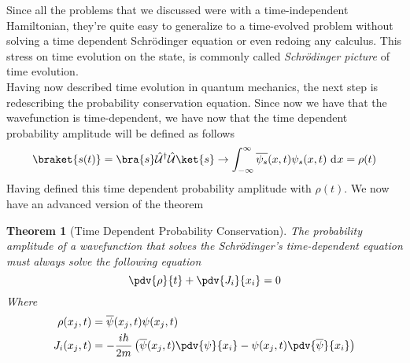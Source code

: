 \documentclass[a4paper, 11pt]{book}
\newcommand{\1}{\opr{\mathds{1}}}
\newcommand{\diff}[2][]{\ \mathrm{d}^{#1}#2}
\newcommand{\opr}[1]{\hat{#1}}
\newcommand{\adj}[2][]{#2^{\dagger#1}}
\newcommand{\U}{\opr{\mathcal{U}}}
\newtheorem{thm}{Theorem}
\theoremstyle{plain}
\begin{document}
	Since all the problems that we discussed were with a time-independent Hamiltonian, they're quite easy to generalize to a time-evolved problem without solving a time dependent Schrödinger equation or even redoing any calculus.
	This stress on time evolution on the state, is commonly called \textit{Schrödinger picture} of time evolution.\\
	Having now described time evolution in quantum mechanics, the next step is redescribing the probability conservation equation. Since now we have that the wavefunction is time-dependent, we have now that the time dependent probability amplitude will be defined as follows
	\begin{equation*}
		\braket{s(t)}=\bra{s}\adj{\U}\U\ket{s}\to\int_{-\infty}^{\infty}\overline{\psi_s}(x,t)\psi_s(x,t)\diff{x}=\rho(t)
	\end{equation*}
	Having defined this time dependent probability amplitude with $\rho(t)$. We now have an advanced version of the theorem %
	\begin{thm}[Time Dependent Probability Conservation]
		The probability amplitude of a wavefunction that solves the Schrödinger's time-dependent equation must always solve the following equation
		\begin{equation*}
			\pdv{\rho}{t}+\pdv{J_i}{x_i}=0
		\end{equation*}
		Where
		\begin{equation*}
			\begin{aligned}
				\rho(x_j,t)&=\overline{\psi}(x_j,t)\psi(x_j,t)\\
				J_i(x_j,t)&=-\frac{i\hbar}{2m}\left( \overline{\psi}(x_j,t)\pdv{\psi}{x_i}-\psi(x_j,t)\pdv{\overline{\psi}}{x_i} \right)
			\end{aligned}
		\end{equation*}
	\end{thm}
\end{document}
